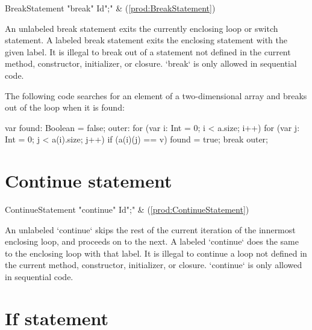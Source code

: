 \begin{bbgrammar}
      BreakStatement \: \xcd"break" Id\opt \xcd";" & (\ref{prod:BreakStatement}) \\
\end{bbgrammar}


An unlabeled break statement exits the currently enclosing loop or switch
statement. A labeled break statement exits the enclosing 
statement with the given label.
It is illegal to break out of a statement not defined in the current
method, constructor, initializer, or closure.  
\xcd`break` is only allowed in sequential code.

\begin{ex}
The following code searches for an element of a two-dimensional
array and breaks out of the loop when it is found:
\begin{xten}
var found: Boolean = false;
outer: for (var i: Int = 0; i < a.size; i++)
    for (var j: Int = 0; j < a(i).size; j++)
        if (a(i)(j) == v) {
            found = true;
            break outer;
        }
\end{xten}
\end{ex}

\section{Continue statement}

\begin{bbgrammar}
   ContinueStatement \: \xcd"continue" Id\opt \xcd";" & (\ref{prod:ContinueStatement}) \\
\end{bbgrammar}
An unlabeled \xcd`continue` skips the rest of the current iteration of the
innermost enclosing loop, and proceeds on to the next.  A labeled
\xcd`continue` does the same to the enclosing loop with that label.
It is illegal to continue a loop not defined in the current
method, constructor, initializer, or closure.
\xcd`continue` is only allowed in sequential code.



\section{If statement}

